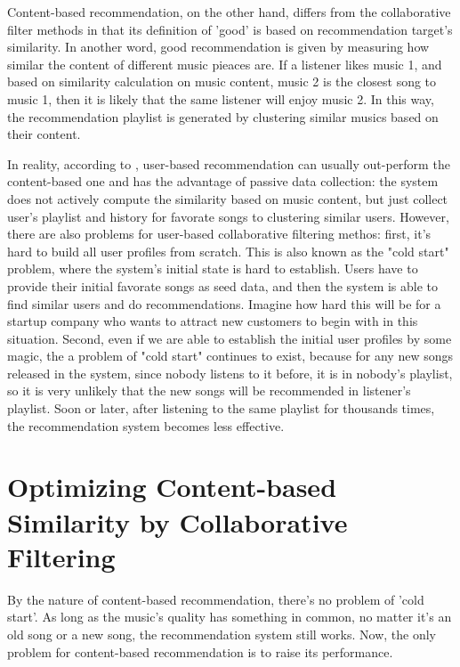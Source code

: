 \documentclass[jou]{apa6}
\begin{document}
Content-based recommendation, on the other hand, differs from the collaborative filter 
methods in that its definition of 'good' is based on recommendation target's similarity.
In another word, good recommendation is given by measuring how similar the content of 
different music pieaces are. If a listener likes \textsf{music 1}, and based on similarity
calculation on music content, \textsf{music 2} is the closest song to \textsf{music 1},
then it is likely that the same listener will enjoy \textsf{music 2}. In this way, the 
recommendation playlist is generated by clustering similar musics based on their content.

In reality, according to \textcite{barrington2009smarter}, user-based 
recommendation can usually out-perform the content-based one  and has the
advantage of passive data collection: the system does not actively compute the similarity
based on music content, but just collect user's playlist and history for favorate songs 
to clustering similar users. However, there are also problems for user-based collaborative
filtering methos: first, it's hard to build all user profiles from scratch. This is 
also known as the "cold start" problem, where the system's initial state is hard to establish.
Users have to provide their initial favorate songs as seed data, and then the system is 
able to find similar users and do recommendations. Imagine how hard this will be for 
a startup company who wants to attract new customers to begin with in this situation. 
Second, even if we are able to establish the initial user profiles by some magic, 
the a problem of "cold start" continues to exist, because for any new songs released 
in the system, since nobody listens to it before, it is in nobody's playlist, 
so it is very unlikely that the new songs will be recommended
in listener's playlist. Soon or later, after listening to the same playlist for thousands 
times, the recommendation system becomes less effective.

\section{Optimizing Content-based Similarity by Collaborative Filtering}

By the nature of content-based recommendation, there's no problem of 'cold start'. As long
as the music's quality has something in common, no matter it's an old song or a new song, 
the recommendation system still works. Now, the only problem for content-based recommendation
is to raise its performance. 
\end{document}
